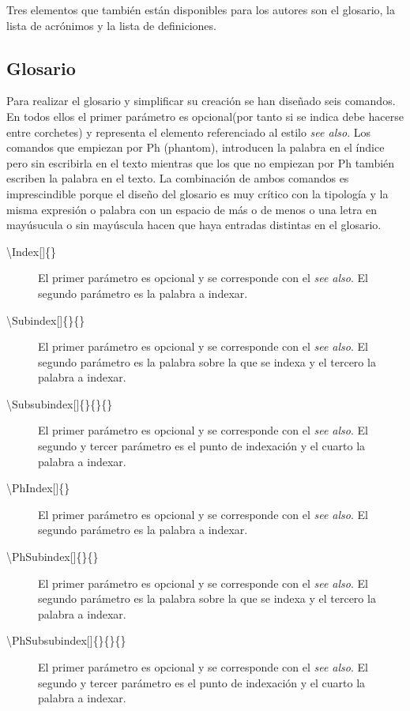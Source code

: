 Tres elementos que también están disponibles para los autores son el glosario, la lista de acrónimos y la lista de definiciones.

\subsection{Glosario}

Para realizar el glosario y simplificar su creación se han diseñado seis comandos. En todos ellos el primer parámetro es opcional(por tanto si se indica debe hacerse entre corchetes) y representa el elemento referenciado al estilo \textit{see also}. Los comandos que empiezan por Ph (phantom), introducen la palabra en el índice pero sin escribirla en el texto mientras que los que no empiezan por Ph también escriben la palabra en el texto. La combinación de ambos comandos es imprescindible porque el diseño del glosario es muy crítico con la tipología y la misma expresión o palabra con un espacio de más o de menos o una letra en mayúsucula o sin mayúscula hacen que haya entradas distintas en el glosario.

\begin{description}
  \item [\textbackslash Index{[]}\{\}] El primer parámetro es opcional y se corresponde con el \textit{see also}. El segundo parámetro es la palabra a indexar.
  \item [\textbackslash Subindex{[]}\{\}\{\}] El primer parámetro es opcional y se corresponde con el \textit{see also}. El segundo parámetro es la palabra sobre la que se indexa y el tercero la palabra a indexar.
  \item [\textbackslash Subsubindex{[]}\{\}\{\}\{\}] El primer parámetro es opcional y se corresponde con el \textit{see also}. El segundo y tercer parámetro es el punto de indexación y el cuarto la palabra a indexar.
  \item [\textbackslash PhIndex{[]}\{\}] El primer parámetro es opcional y se corresponde con el \textit{see also}. El segundo parámetro es la palabra a indexar.
  \item [\textbackslash PhSubindex{[]}\{\}\{\}] El primer parámetro es opcional y se corresponde con el \textit{see also}. El segundo parámetro es la palabra sobre la que se indexa y el tercero la palabra a indexar.
  \item [\textbackslash PhSubsubindex{[]}\{\}\{\}\{\}] El primer parámetro es opcional y se corresponde con el \textit{see also}. El segundo y tercer parámetro es el punto de indexación y el cuarto la palabra a indexar.
\end{description}

